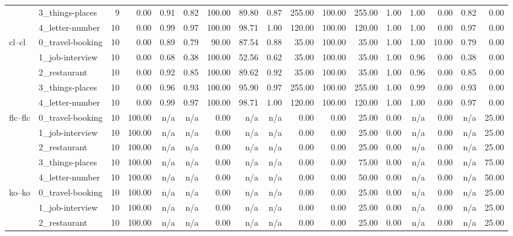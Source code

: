 \begin{tabular}{llrrrrrrrrrrrrrrr}
 & 3_things-places & 9 & 0.00 & 0.91 & 0.82 & 100.00 & 89.80 & 0.87 & 255.00 & 100.00 & 255.00 & 1.00 & 1.00 & 0.00 & 0.82 & 0.00 \\
 & 4_letter-number & 10 & 0.00 & 0.99 & 0.97 & 100.00 & 98.71 & 1.00 & 120.00 & 100.00 & 120.00 & 1.00 & 1.00 & 0.00 & 0.97 & 0.00 \\
\cline{1-17}
\multirow[t]{5}{*}{cl--cl} & 0_travel-booking & 10 & 0.00 & 0.89 & 0.79 & 90.00 & 87.54 & 0.88 & 35.00 & 100.00 & 35.00 & 1.00 & 1.00 & 10.00 & 0.79 & 0.00 \\
 & 1_job-interview & 10 & 0.00 & 0.68 & 0.38 & 100.00 & 52.56 & 0.62 & 35.00 & 100.00 & 35.00 & 1.00 & 0.96 & 0.00 & 0.38 & 0.00 \\
 & 2_restaurant & 10 & 0.00 & 0.92 & 0.85 & 100.00 & 89.62 & 0.92 & 35.00 & 100.00 & 35.00 & 1.00 & 0.96 & 0.00 & 0.85 & 0.00 \\
 & 3_things-places & 10 & 0.00 & 0.96 & 0.93 & 100.00 & 95.90 & 0.97 & 255.00 & 100.00 & 255.00 & 1.00 & 0.99 & 0.00 & 0.93 & 0.00 \\
 & 4_letter-number & 10 & 0.00 & 0.99 & 0.97 & 100.00 & 98.71 & 1.00 & 120.00 & 100.00 & 120.00 & 1.00 & 1.00 & 0.00 & 0.97 & 0.00 \\
\cline{1-17}
\multirow[t]{5}{*}{flc--flc} & 0_travel-booking & 10 & 100.00 & n/a & n/a & 0.00 & n/a & n/a & 0.00 & 0.00 & 25.00 & 0.00 & n/a & 0.00 & n/a & 25.00 \\
 & 1_job-interview & 10 & 100.00 & n/a & n/a & 0.00 & n/a & n/a & 0.00 & 0.00 & 25.00 & 0.00 & n/a & 0.00 & n/a & 25.00 \\
 & 2_restaurant & 10 & 100.00 & n/a & n/a & 0.00 & n/a & n/a & 0.00 & 0.00 & 25.00 & 0.00 & n/a & 0.00 & n/a & 25.00 \\
 & 3_things-places & 10 & 100.00 & n/a & n/a & 0.00 & n/a & n/a & 0.00 & 0.00 & 75.00 & 0.00 & n/a & 0.00 & n/a & 75.00 \\
 & 4_letter-number & 10 & 100.00 & n/a & n/a & 0.00 & n/a & n/a & 0.00 & 0.00 & 50.00 & 0.00 & n/a & 0.00 & n/a & 50.00 \\
\cline{1-17}
\multirow[t]{5}{*}{ko--ko} & 0_travel-booking & 10 & 100.00 & n/a & n/a & 0.00 & n/a & n/a & 0.00 & 0.00 & 25.00 & 0.00 & n/a & 0.00 & n/a & 25.00 \\
 & 1_job-interview & 10 & 100.00 & n/a & n/a & 0.00 & n/a & n/a & 0.00 & 0.00 & 25.00 & 0.00 & n/a & 0.00 & n/a & 25.00 \\
 & 2_restaurant & 10 & 100.00 & n/a & n/a & 0.00 & n/a & n/a & 0.00 & 0.00 & 25.00 & 0.00 & n/a & 0.00 & n/a & 25.00 \\

\end{tabular}
